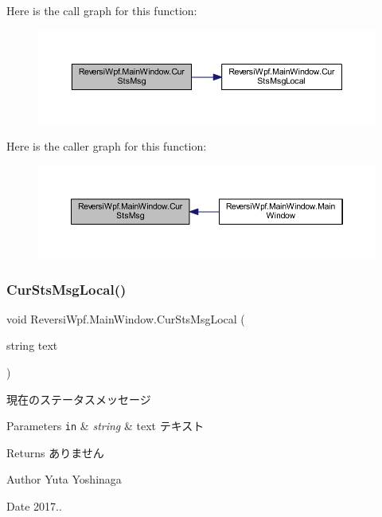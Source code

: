 Here is the call graph for this function\+:
\nopagebreak
\begin{figure}[H]
\begin{center}
\leavevmode
\includegraphics[width=350pt]{class_reversi_wpf_1_1_main_window_a90e6aa75849526159fe9348da2b66fb0_cgraph}
\end{center}
\end{figure}
Here is the caller graph for this function\+:
\nopagebreak
\begin{figure}[H]
\begin{center}
\leavevmode
\includegraphics[width=350pt]{class_reversi_wpf_1_1_main_window_a90e6aa75849526159fe9348da2b66fb0_icgraph}
\end{center}
\end{figure}
\mbox{\label{class_reversi_wpf_1_1_main_window_a73402ffecf2de584339327dce357bd60}} 
\subsubsection{\texorpdfstring{Cur\+Sts\+Msg\+Local()}{CurStsMsgLocal()}}
{\footnotesize\ttfamily void Reversi\+Wpf.\+Main\+Window.\+Cur\+Sts\+Msg\+Local (\begin{DoxyParamCaption}\item[{string}]{text }\end{DoxyParamCaption})}



現在のステータスメッセージ 


\begin{DoxyParams}[1]{Parameters}
\mbox{\tt in}  & {\em string} & text テキスト \\
\hline
\end{DoxyParams}
\begin{DoxyReturn}{Returns}
ありません 
\end{DoxyReturn}
\begin{DoxyAuthor}{Author}
Yuta Yoshinaga 
\end{DoxyAuthor}
\begin{DoxyDate}{Date}
2017.. 
\end{DoxyDate}



